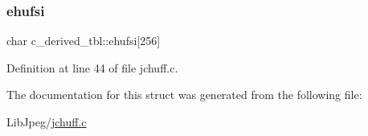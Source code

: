 \subsubsection{\texorpdfstring{ehufsi}{ehufsi}}
{\footnotesize\ttfamily char c\+\_\+derived\+\_\+tbl\+::ehufsi\mbox{[}256\mbox{]}}



Definition at line 44 of file jchuff.\+c.



The documentation for this struct was generated from the following file\+:\begin{DoxyCompactItemize}
\item 
Lib\+Jpeg/\mbox{\hyperlink{jchuff_8c}{jchuff.\+c}}\end{DoxyCompactItemize}
